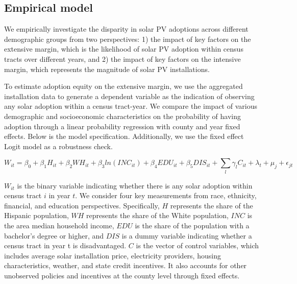 \documentclass[12pt,twoside,letterpaper]{article}
\begin{document}
\subsection{Empirical model}

We empirically investigate the disparity in solar PV adoptions across different demographic groups from two perspectives: 1) the impact of key factors on the extensive margin, which is the likelihood of solar PV adoption within census tracts over different years, and 2) the impact of key factors on the intensive margin, which represents the magnitude of solar PV installations.

To estimate adoption equity on the extensive margin, we use the aggregated installation data to generate a dependent variable as the indication of observing any solar adoption within a census tract-year. We compare the impact of various demographic and socioeconomic characteristics on the probability of having adoption through a linear probability regression with county and year fixed effects. Below is the model specification. Additionally, we use the fixed effect Logit model as a robustness check.



\begin{equation}
W_{it}= \beta_{0} + \beta_{1}H_{it} + \beta_{2}WH_{it} + \beta_{3}ln(INC_{it}) + \beta_{4}EDU_{it} + \beta_{5}DIS_{it} +\sum_{l}\gamma_{l}C_{it} + \lambda_{t} + \mu_{j} + \epsilon_{jt}
\end{equation}

\begin{math} W_{it} \end{math} is the binary variable indicating whether there is any solar adoption within census tract \begin{math} i \end{math} in year \begin{math} t \end{math}. We consider four key measurements from race, ethnicity, financial, and education perspectives. Specifically, \begin{math} H \end{math} represents the share of the Hispanic population, \begin{math} WH \end{math} represents the share of the White population, \begin{math} INC \end{math} is the area median household income, \begin{math} EDU \end{math} is the share of the population with a bachelor's degree or higher, and \begin{math} DIS \end{math} is a dummy variable indicating whether a census tract in year t is disadvantaged. \begin{math} C \end{math} is the vector of control variables, which includes average solar installation price, electricity providers, housing characteristics, weather, and state credit incentives. It also accounts for other unobserved policies and incentives at the county level through fixed effects.
\end{document}

